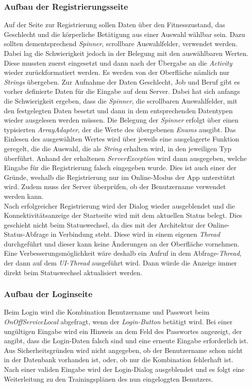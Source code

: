 \subsubsection*{Aufbau der Registrierungsseite}
Auf der Seite zur Registrierung sollen Daten über den Fitnesszustand, das Geschlecht und die körperliche Betätigung aus einer Auswahl wählbar sein. Dazu sollten dementsprechend \textit{Spinner}, scrollbare Auswahlfelder, verwendet werden. Dabei lag die Schwierigkeit jedoch in der Belegung mit den auswählbaren Werten. Diese mussten zuerst eingesetzt und dann nach der Übergabe an die \textit{Activity} wieder zurückformatiert werden. Es werden von der Oberfläche nämlich nur \textit{Strings} übergeben. 
Zur Aufnahme der Daten Geschlecht, Job und Beruf gibt es vorher definierte Daten für die Eingabe auf dem Server. Dabei hat sich anfangs die Schwierigkeit ergeben, dass die \textit{Spinner}, die scrollbaren Auswahlfelder, mit den festgelegten Daten besetzt und dann in dem entsprechenden Datentypen wieder ausgelesen werden müssen. Die Belegung der \textit{Spinner} erfolgt über einen typisierten \textit{ArrayAdapter}, der die Werte des übergebenen \textit{Enums} ausgibt. Das Einlesen des ausgewählten Wertes wird über jeweils eine ausgelagerte Funktion geregelt, die die Auswahl, die als \textit{String} erhalten wird, in den jeweiligen Typ überführt. Anhand der erhaltenen \textit{ServerException} wird dann ausgegeben, welche Eingabe für die Registrierung falsch eingegeben wurde. Dies ist auch einer der Gründe, weshalb die Registrierung nur im Online-Modus der App unterstützt wird. Zudem muss der Server überprüfen, ob der Benutzername verwendet werden kann.\\
Nach erfolgreicher Registrierung wird der Dialog wieder ausgeblendet und die Konnektivitätsanzeige der Startseite wird mit dem aktuellen Status belegt. Dies geschieht nicht beim Statuswechsel, da dies mit der Architektur der Online-Status-Abfrage in Verbindung steht. Diese wird in einem eigenen \textit{Thread} durchgeführt und dieser kann keine Änderungen an der Oberfläche vornehmen. Eine Verbesserungsmöglichkeit wäre deshalb ein Aufruf in dem Abfrage-\textit{Thread}, der dann auf dem \textit{UI-Thread} ausgeführt wird. Dann würde die Anzeige immer direkt beim Statuswechsel aktualisiert werden.\\
\subsubsection*{Aufbau der Loginseite}
Beim Login wird die Kombination Benutzername und Passwort beim \textit{OnOffServiceLocal} abgefragt, wenn der \textit{Login-Button} betätigt wird. Bei einer ungültigen Eingabe wird ein Hinweis an dem Feld des Passwortes angezeigt, der angibt, dass die Login-Daten falsch sind und eine erneute Eingabe erforderlich ist. Aus Sicherheitsgründen wird nicht angegeben, ob der Benutzername schon nicht in der Datenbank vorhanden ist, oder, ob nur die Kombination fehlerhaft ist. Nach einer validen Eingabe wird der Login-Dialog ausgeblendet und es folgt eine Weiterleitung zu den Trainingsplänen des nun eingeloggten Benutzers.\\
